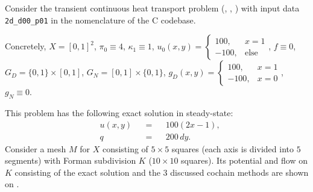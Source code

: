 \begin{example}
  Consider the transient continuous heat transport problem
  (,
   ,
   )
  with input data \verb|2d_d00_p01| in the nomenclature of the C codebase.

  Concretely,
    $X = [0, 1]^2$,
    $\pi_0 \equiv 4$,
    $\kappa_1 \equiv 1$,
    $u_0(x, y) =
      \begin{cases}
        100, & x = 1 \\
        -100, & \text{else}
      \end{cases}$,
    $f \equiv 0$,
    $G_D = \{0, 1\} \times [0, 1]$,
    $G_N = [0, 1] \times \{0, 1\}$,
    $g_D(x, y) = 
      \begin{cases}
        100, & x = 1 \\
        -100, & x = 0
      \end{cases}$,
    $g_N \equiv 0$.

  This problem has the following exact solution in steady-state:
  \begin{subequations}
    \begin{alignat}{3}
      & u(x, y) && = && 100 (2 x - 1), \\
      & q && = && 200\, d y.
    \end{alignat}
  \end{subequations}
  Consider a mesh $M$ for $X$ consisting of $5 \times 5$ squares (each axis is
  divided into $5$ segments) with Forman subdivision $K$
  ($10 \times 10$ squares).
  Its potential and flow on $K$ consisting of the exact solution and the $3$
  discussed cochain methods are shown on
  .
\end{example}

